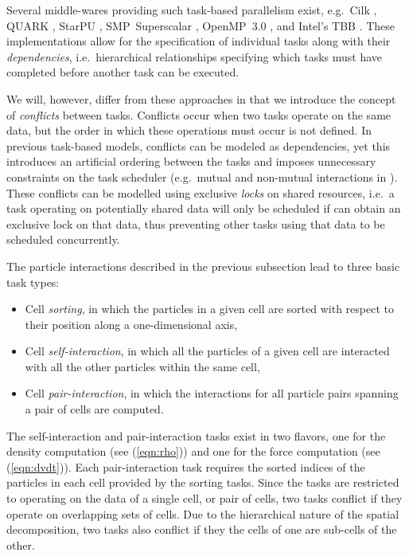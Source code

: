 \documentclass[final]{siamltex}
\newcommand{\eqn}[1]
    {(\ref{eqn:#1})}
\begin{document}
Several middle-wares providing such task-based
parallelism exist, e.g.~Cilk \cite{ref:Blumofe1995}, QUARK \cite{ref:QUARK},
StarPU \cite{ref:Augonnet2011}, SMP~Superscalar \cite{ref:SMPSuperscalar},
OpenMP~3.0 \cite{ref:Duran2009}, and Intel's TBB \cite{ref:Reinders2007}.
These implementations allow for the specification of individual tasks
along with their {\em dependencies}, i.e.~hierarchical relationships
specifying which tasks must have completed before another task
can be executed.

We will, however, differ from these approaches in that we introduce the
concept of {\em conflicts} between tasks.
Conflicts occur when two tasks operate on the same data, 
but the order in which these operations must occur is not defined.
In previous task-based models, conflicts can be modeled as dependencies,
yet this introduces an artificial ordering between the tasks
and imposes unnecessary constraints on the task scheduler
(e.g.~mutual and non-mutual interactions in \cite{ref:Ltaief2012}).
These conflicts can be modelled using exclusive {\em locks} on shared
resources, i.e.~a task operating on potentially shared data will
only be scheduled if can obtain an exclusive lock on that data,
thus preventing other tasks using that data to be scheduled concurrently.

The particle interactions described in the previous subsection
lead to three basic task types:
%
\begin{itemize}
    \item Cell {\em sorting}, in which the particles in a given
        cell are sorted with respect to their position along a
        one-dimensional axis,
    \item Cell {\em self-interaction}, in which all the particles
        of a given cell are interacted with all the other particles
        within the same cell,
    \item Cell {\em pair-interaction}, in which the interactions for
        all particle pairs spanning a pair of cells are computed. 
\end{itemize}
%
The self-interaction and pair-interaction tasks exist in
two flavors, one for the density computation (see \eqn{rho})
and one for the force computation (see \eqn{dvdt}).
Each pair-interaction task requires the sorted indices of
the particles in each cell provided by the sorting tasks.
Since the tasks are restricted to operating on the data of a
single cell, or pair of cells, two tasks conflict if they
operate on overlapping sets of cells.
Due to the hierarchical nature of the spatial decomposition,
two tasks also conflict if they the cells of one are sub-cells
of the other.
\end{document}
